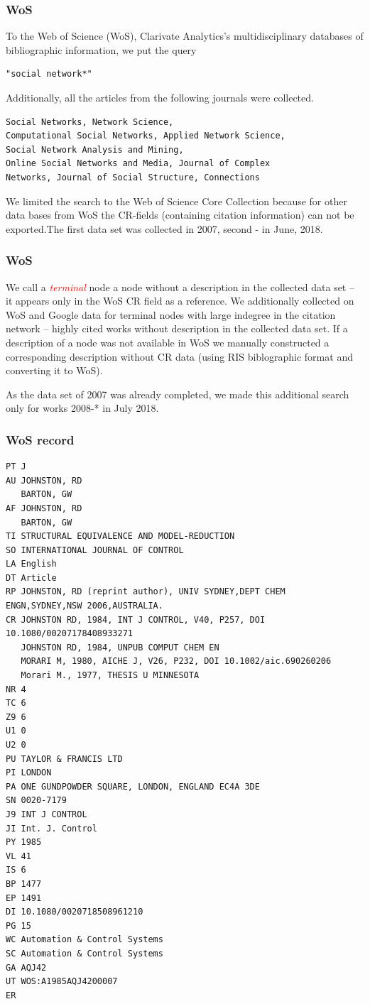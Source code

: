 \documentclass[hyperref={pdfstartview={FitBH -32768},
                         pdfpagemode=FullScreen,
                         plainpages=false,
                         colorlinks=true}
              ]{beamer}
\newcommand{\keyw}[1]{\textcolor{red}{\emph{#1}}}
\begin{document}
\begin{frame}[fragile]
\frametitle{WoS}
\small

To the Web of Science (WoS), Clarivate Analytics’s multidisciplinary databases of bibliographic
information, we put the query
\begin{verbatim} 
"social network*"
\end{verbatim}
Additionally, all the articles from the following journals were collected.
\begin{verbatim}
Social Networks, Network Science, 
Computational Social Networks, Applied Network Science, 
Social Network Analysis and Mining,
Online Social Networks and Media, Journal of Complex 
Networks, Journal of Social Structure, Connections 
\end{verbatim}
We limited the search to the Web of Science Core Collection because for other data bases from WoS the CR-fields (containing citation information) can not
be exported.The first data set was collected in 2007, second - in June, 2018. 
\end{frame}

\begin{frame}[fragile]
\frametitle{WoS}
\small

We call a \keyw{terminal} node  a node without a description in the collected data set -- it appears only in the WoS CR field as a reference. We additionally collected on WoS and Google data for terminal nodes with large indegree in the citation network -- highly cited works without description in the collected data set. If a description of a node was not available in WoS we manually constructed a corresponding description without CR data (using RIS biblographic format and converting it to WoS).\medskip

As the data set of 2007 was already completed, we made this additional search only for works 2008-* in July 2018. 
\end{frame}


\begin{frame}[fragile]
\frametitle{WoS record}
\renewcommand{\baselinestretch}{0.8}
\tiny
\begin{verbatim}
PT J
AU JOHNSTON, RD
   BARTON, GW
AF JOHNSTON, RD
   BARTON, GW
TI STRUCTURAL EQUIVALENCE AND MODEL-REDUCTION
SO INTERNATIONAL JOURNAL OF CONTROL
LA English
DT Article
RP JOHNSTON, RD (reprint author), UNIV SYDNEY,DEPT CHEM ENGN,SYDNEY,NSW 2006,AUSTRALIA.
CR JOHNSTON RD, 1984, INT J CONTROL, V40, P257, DOI 10.1080/00207178408933271
   JOHNSTON RD, 1984, UNPUB COMPUT CHEM EN
   MORARI M, 1980, AICHE J, V26, P232, DOI 10.1002/aic.690260206
   Morari M., 1977, THESIS U MINNESOTA
NR 4
TC 6
Z9 6
U1 0
U2 0
PU TAYLOR & FRANCIS LTD
PI LONDON
PA ONE GUNDPOWDER SQUARE, LONDON, ENGLAND EC4A 3DE
SN 0020-7179
J9 INT J CONTROL
JI Int. J. Control
PY 1985
VL 41
IS 6
BP 1477
EP 1491
DI 10.1080/0020718508961210
PG 15
WC Automation & Control Systems
SC Automation & Control Systems
GA AQJ42
UT WOS:A1985AQJ4200007
ER
\end{verbatim}

\end{frame}
\end{document}
